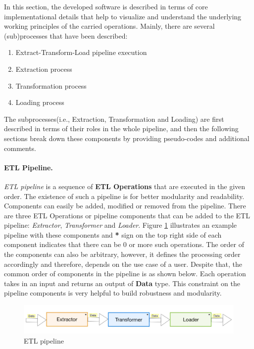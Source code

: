 In this section, the developed software is described in terms of core implementational details that 
help to visualize and understand the underlying working principles of the carried operations. Mainly, 
there are several (sub)processes that have been described:

\begin{enumerate}
	\item Extract-Transform-Load pipeline execution
	\item Extraction process
	\item Transformation process
	\item Loading process
\end{enumerate}

The subprocesses(i.e., Extraction, Transformation and Loading) are first described in terms of 
their roles in the whole pipeline, and then the following sections break down these components by 
providing pseudo-codes and additional comments.

\paragraph{ETL Pipeline.}
\textit{ETL pipeline} is a sequence of \textbf{ETL Operations} that are executed in the given order. 
The existence of such a pipeline is for better modularity and readability. Components can easily be 
added, modified or removed from the pipeline. There are three ETL Operations or pipeline components 
that can be 
added to the ETL pipeline: \textit{Extractor}, \textit{Transformer} and \textit{Loader}. Figure 
\ref{fig:etl_pipeline} illustrates an example pipeline with these components and \textbf{*} sign on 
the top right side of each component indicates that there can be 0 or more such operations. The order 
of the components can also be arbitrary, however, it defines the processing order accordingly and 
therefore, depends on the use case of a user. Despite that, the common order of components in the 
pipeline is as shown below. Each operation takes in an input and returns an output of \textbf{Data} 
type. This constraint on the pipeline components is very helpful to build robustness and modularity.

\begin{figure}[H]
	\centering
	\includegraphics[width=\textwidth]{../../resources/etl_pipeline.jpg}
	\caption{ETL pipeline}
	\label{fig:etl_pipeline}
\end{figure}

